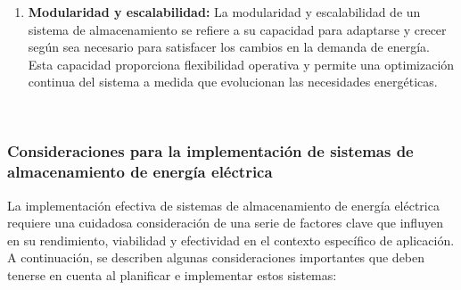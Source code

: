 \documentclass[11pt]{article}
\begin{document}
\begin{enumerate}
                \item \textbf{Modularidad y escalabilidad:} La modularidad y escalabilidad de un sistema de almacenamiento se refiere a su capacidad
                para adaptarse y crecer según sea necesario para satisfacer los cambios en la demanda de
                energía. Esta capacidad proporciona flexibilidad operativa y permite una optimización
                continua del sistema a medida que evolucionan las necesidades energéticas.
            \end{enumerate}

            

            \ \subsubsection{Consideraciones para la implementación de sistemas de almacenamiento de energía
                             eléctrica} 
            
                             La implementación efectiva de sistemas de almacenamiento de energía eléctrica requiere
                             una cuidadosa consideración de una serie de factores clave que influyen en su rendimiento,
                             viabilidad y efectividad en el contexto específico de aplicación. A continuación, se describen
                             algunas consideraciones importantes que deben tenerse en cuenta al planificar e
                             implementar estos sistemas:
\end{document}
